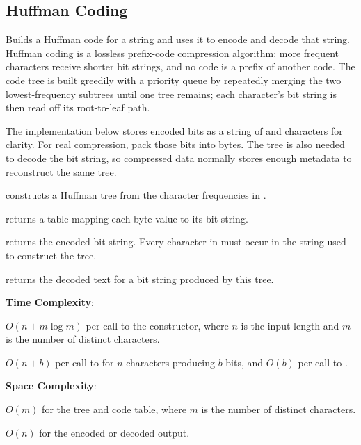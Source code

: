\subsection{Huffman Coding}
\label{sec:3.8.4}
Builds a Huffman code for a string and uses it to encode and decode that string. Huffman coding is a lossless prefix-code compression algorithm: more frequent characters receive shorter bit strings, and no code is a prefix of another code. The code tree is built greedily with a priority queue by repeatedly merging the two lowest-frequency subtrees until one tree remains; each character's bit string is then read off its root-to-leaf path.

The implementation below stores encoded bits as a string of \inlinecode{\textquotesingle{}0\textquotesingle{}} and \inlinecode{\textquotesingle{}1\textquotesingle{}} characters for clarity. For real compression, pack those bits into bytes. The tree is also needed to decode the bit string, so compressed data normally stores enough metadata to reconstruct the same tree.

\begin{compactitem}
  \item {} constructs a Huffman tree from the character frequencies in .
  \item {} returns a table mapping each byte value to its bit string.
  \item {} returns the encoded bit string. Every character in  must occur in the string used to construct the tree.
  \item {} returns the decoded text for a bit string produced by this tree.
\end{compactitem}

\textbf{Time Complexity}:
\begin{compactitem}
  \item $O(n + m \log m)$ per call to the constructor, where $n$ is the input length and $m$ is the number of distinct characters.
  \item $O(n + b)$ per call to  for $n$ characters producing $b$ bits, and $O(b)$ per call to .
\end{compactitem}

\textbf{Space Complexity}:
\begin{compactitem}
  \item $O(m)$ for the tree and code table, where $m$ is the number of distinct characters.
  \item $O(n)$ for the encoded or decoded output.
\end{compactitem}

